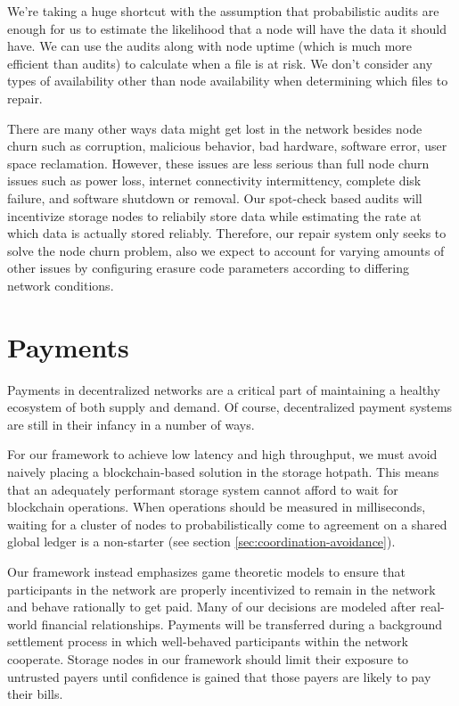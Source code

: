\documentclass[11pt,fleqn,openany]{book}
\begin{document}
We're taking a huge shortcut with the assumption that
probabilistic audits are enough for us to estimate the likelihood that a node
will have the data it should have. We can use the audits
along with node uptime (which is much more efficient than audits)
to calculate when a file is at risk.
We don't consider any types of availability other than node availability when
determining which files to repair.

There are many other ways data might get lost in the network besides node churn such as corruption, malicious behavior, bad hardware, software error, user space
reclamation. However, these issues are less serious than full node
churn issues such as power loss, internet connectivity intermittency, complete disk failure,
and software shutdown or removal.
Our spot-check based audits will incentivize storage nodes to reliabily store
data
while estimating the rate at which data is actually stored reliably.
Therefore, our repair system only seeks to solve the node churn problem, also
we expect to account for varying
amounts of other issues by configuring erasure code
parameters according to differing network conditions.

\section{Payments}

Payments in decentralized networks are a critical part of maintaining a healthy
ecosystem of both supply and demand. Of course, decentralized payment systems
are still in their infancy in a number of ways.

For our framework to achieve low latency and high throughput, we must
avoid naively placing a blockchain-based solution in the storage hotpath.
This means that an adequately performant storage system cannot afford to
wait for blockchain operations. When operations should be measured in
milliseconds, waiting for a cluster of nodes to probabilistically come to
agreement on a shared global ledger is a non-starter
(see section \ref{sec:coordination-avoidance}).

Our framework instead emphasizes game theoretic models to ensure
that participants in the network are properly incentivized to remain in the
network and behave rationally to get paid.
Many of our decisions are modeled after real-world financial relationships.
Payments will be transferred during
a background settlement process in which well-behaved participants within 
the network cooperate. Storage nodes in our framework should limit their exposure
to untrusted payers until confidence is gained that those payers are likely
to pay their bills.
\end{document}
